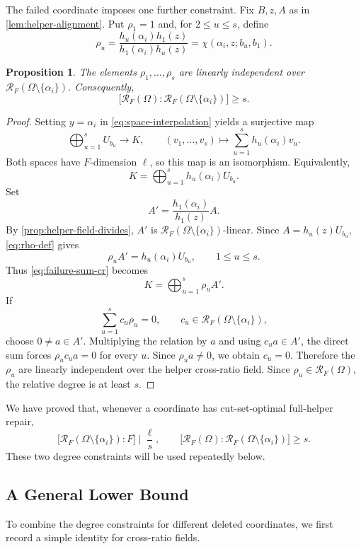 \documentclass[11pt,onecolumn]{IEEEtran}
\newtheorem{proposition}{Proposition}
\newcommand{\crf}{\mathscr R}
\begin{document}
The failed coordinate imposes one further constraint. Fix $B,z,A$ as in
\cref{lem:helper-alignment}. Put $\rho_1=1$
and, for $2\le u\le s$, define
\begin{equation}
\rho_u
=
\frac{h_u(\alpha_i)h_1(z)}{h_1(\alpha_i)h_u(z)}
=
\chi(\alpha_i,z;b_u,b_1).
\label{eq:rho-def}
\end{equation}

\begin{proposition}
\label{prop:failure-field-growth}
The elements $\rho_1,\ldots,\rho_s$ are linearly independent over
$\crf_F(\Omega\setminus\{\alpha_i\})$. Consequently,
\[
\bigl[
\crf_F(\Omega):
\crf_F(\Omega\setminus\{\alpha_i\})
\bigr]\ge s.
\]
\end{proposition}

\begin{proof}
Setting $y=\alpha_i$ in \eqref{eq:space-interpolation} yields a
surjective map
\[
\bigoplus_{u=1}^sU_{b_u}\longrightarrow K,
\qquad
(v_1,\ldots,v_s)\longmapsto
\sum_{u=1}^sh_u(\alpha_i)v_u.
\]
Both spaces have $F$-dimension $\ell$, so this map is an isomorphism.
Equivalently,
\begin{equation}
K=\bigoplus_{u=1}^sh_u(\alpha_i)U_{b_u}.
\label{eq:failure-sum-cr}
\end{equation}
Set
\[
A'=\frac{h_1(\alpha_i)}{h_1(z)}A.
\]
By \cref{prop:helper-field-divides}, $A'$ is
$\crf_F(\Omega\setminus\{\alpha_i\})$-linear.  Since
$A=h_u(z)U_{b_u}$, \eqref{eq:rho-def} gives
\[
\rho_uA'=h_u(\alpha_i)U_{b_u},
\qquad 1\le u\le s.
\]
Thus \eqref{eq:failure-sum-cr} becomes
\[
K=\bigoplus_{u=1}^s\rho_uA'.
\]
If
\[
\sum_{u=1}^sc_u\rho_u=0,
\qquad
c_u\in\crf_F(\Omega\setminus\{\alpha_i\}),
\]
choose $0\ne a\in A'$. Multiplying the relation by $a$ and using
$c_ua\in A'$, the direct sum forces $\rho_uc_ua=0$ for every $u$.
Since $\rho_ua\ne0$, we obtain $c_u=0$.  Therefore the $\rho_u$ are
linearly independent over the helper cross-ratio field.  Since
$\rho_u\in\crf_F(\Omega)$, the relative degree is at least $s$.
\end{proof}

We have proved that, whenever a coordinate has cut-set-optimal
full-helper repair,
\[
\bigl[\crf_F(\Omega\setminus\{\alpha_i\}):F\bigr]
\mid\frac{\ell}{s},
\qquad
\bigl[
\crf_F(\Omega):\crf_F(\Omega\setminus\{\alpha_i\})
\bigr]\ge s.
\]
These two degree constraints will be used repeatedly below.

\subsection{A General Lower Bound}
To combine the degree constraints for different deleted
coordinates, we first record a simple identity for cross-ratio fields.
\end{document}
